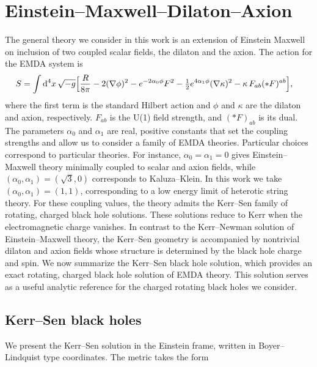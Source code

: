 \section{Einstein--Maxwell--Dilaton--Axion}
\label{sec:emda}
The general theory we consider in this work is an extension of Einstein Maxwell on inclusion of two coupled scalar fields, the dilaton and the axion.  The action for the EMDA system is
\begin{equation}
\begin{aligned}
S=\int \mathrm{d}^4 x\,\sqrt{-g}\Big[
&{R\over8\pi}-2(\nabla\phi)^2-e^{-2\alpha_0\phi}F^2-\tfrac12 e^{4\alpha_1\phi}(\nabla\kappa)^2
-\kappa\,F_{ab}(*F)^{ab}
\Big],
\label{EMDA_action} 
\end{aligned}
\end{equation}
where the first term is the standard Hilbert action and \(\phi\) and \(\kappa\) are the dilaton and axion, respectively.
\(F_{ab}\) is the U(1) field strength, and \((*F)_{ab}\) is
its dual. The parameters $\alpha_0$ and $\alpha_1$ are real, positive constants
that set the coupling strengths and allow us to consider a family of EMDA
theories. Particular choices correspond to particular theories. For
instance, $\alpha_0=\alpha_1=0$ gives Einstein--Maxwell theory minimally
coupled to scalar and axion fields, while
$(\alpha_0,\alpha_1)=(\sqrt{3},0)$ corresponds to Kaluza--Klein.
In this work we take $(\alpha_0,\alpha_1)=(1,1)$, corresponding to a
low energy limit of heterotic string theory. For these coupling values, the
theory admits the Kerr--Sen family of rotating, charged black hole
solutions. These solutions reduce to Kerr when the electromagnetic charge
vanishes. In contrast to the Kerr--Newman solution of Einstein--Maxwell
theory, the Kerr--Sen geometry is accompanied by nontrivial dilaton and
axion fields whose structure is determined by the black hole charge and
spin. We now summarize the Kerr--Sen black hole solution, which provides an exact rotating, charged black hole solution of EMDA theory. This solution serves as a useful analytic reference for the charged rotating black holes we consider.

\subsection{Kerr--Sen black holes}
We present the Kerr--Sen solution in the Einstein frame, written in Boyer--Lindquist type coordinates. The metric takes the form


